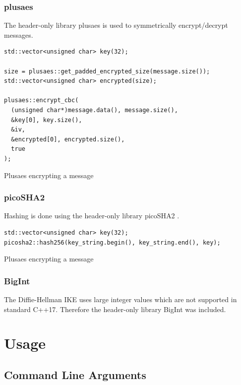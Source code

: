 \documentclass[12pt, letterpaper]{article}
\newenvironment{code}{\captionsetup{type=listing}}{}
\begin{document}
\subsubsection{plusaes}
The header-only library plusaes \cite{plusaes} is used to symmetrically encrypt/decrypt messages.

\begin{code}
	\begin{verbatim}
std::vector<unsigned char> key(32);
	
size = plusaes::get_padded_encrypted_size(message.size());
std::vector<unsigned char> encrypted(size);
	
plusaes::encrypt_cbc(
  (unsigned char*)message.data(), message.size(), 
  &key[0], key.size(), 
  &iv, 
  &encrypted[0], encrypted.size(), 
  true
);

	\end{verbatim}
	\caption{Plusaes encrypting a message}
	\label{plusaes}
\end{code}

\subsubsection{picoSHA2}
Hashing is done using the header-only library picoSHA2 \cite{picosha}.

\begin{code}
	\begin{verbatim}
std::vector<unsigned char> key(32);
picosha2::hash256(key_string.begin(), key_string.end(), key);
	\end{verbatim}
	\caption{Plusaes encrypting a message}
	\label{picosha2}
\end{code}

\subsubsection{BigInt}
The Diffie-Hellman IKE uses large integer values which are not supported in standard C++17. Therefore the header-only library BigInt \cite{bigint} was included.

\pagebreak

\section{Usage}
\label{usage}

\subsection{Command Line Arguments}
\end{document}

